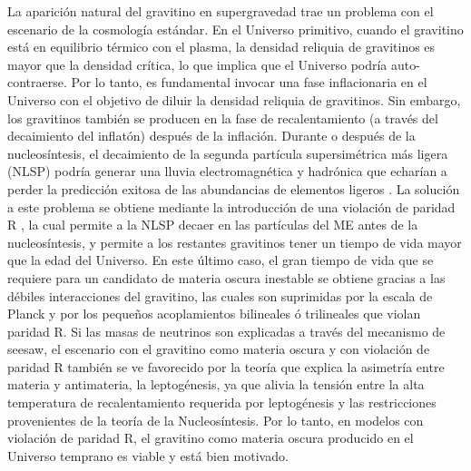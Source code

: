 La aparición natural del gravitino en supergravedad trae un problema
con el escenario de la cosmología estándar. En el Universo primitivo,
cuando el gravitino está en equilibrio térmico con el plasma, la
densidad reliquia de gravitinos es mayor que la densidad crítica, lo
que implica que el Universo podría auto-contraerse. Por lo tanto, es
fundamental invocar una fase inflacionaria en el Universo con el
objetivo de diluir la densidad reliquia de gravitinos. Sin embargo,
los gravitinos también se producen en la fase de recalentamiento (a
través del decaimiento del inflatón) después de la inflación. Durante
o después de la nucleosíntesis, el decaimiento de la segunda partícula
supersimétrica más ligera (NLSP)  podría
generar una lluvia electromagnética y hadrónica que echarían a
perder la predicción exitosa de las abundancias de elementos ligeros
\cite{Sarkar:1995dd}. La solución a este problema se obtiene mediante
la introducción de una violación de paridad R
\cite{Takayama:2000uz, Buchmuller:2007ui}, la cual permite a la NLSP
decaer en las partículas del ME
antes de la nucleosíntesis, y permite a los restantes gravitinos tener
un tiempo de vida mayor que la edad del Universo. En este último caso,
el gran tiempo de vida que se requiere para un candidato de materia
oscura inestable se obtiene gracias a las débiles interacciones del
gravitino, las cuales son suprimidas por la escala de Planck y por los
pequeños acoplamientos bilineales ó trilineales que violan paridad
R. Si las masas de neutrinos son explicadas a través del mecanismo de
seesaw, el escenario con el gravitino como materia oscura y con
violación de paridad R también se ve favorecido por la teoría que
explica la asimetría entre materia y antimateria, la leptogénesis, ya
que alivia la tensión entre la alta temperatura de recalentamiento
requerida por leptogénesis y las restricciones provenientes de la
teoría de la Nucleosíntesis.  Por lo tanto, en modelos con violación de
paridad R, el gravitino como materia oscura producido en el Universo
temprano es viable y está bien motivado.

